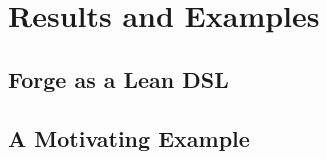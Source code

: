 \section{Results and Examples}

\subsection{Forge as a Lean DSL}


\subsection{A Motivating Example}